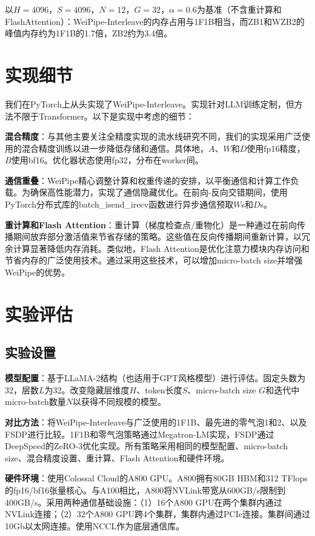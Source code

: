 以$H=4096$，$S=4096$，$N=12$，$G=32$，$\alpha=0.6$为基准（不含重计算和FlashAttention）：WeiPipe-Interleave的内存占用与1F1B相当，而ZB1和WZB2的峰值内存约为1F1B的1.7倍，ZB2约为3.4倍。

\section{实现细节}

我们在PyTorch上从头实现了WeiPipe-Interleave。实现针对LLM训练定制，但方法不限于Transformer。以下是实现中考虑的细节：

\textbf{混合精度}：与其他主要关注全精度实现的流水线研究不同，我们的实现采用广泛使用的混合精度训练以进一步降低存储和通信。具体地，$A$、$W$和$D$使用fp16精度，$B$使用bf16。优化器状态使用fp32，分布在worker间。

\textbf{通信重叠}：WeiPipe精心调整计算和权重传递的安排，以平衡通信和计算工作负载。为确保高性能潜力，实现了通信隐藏优化。在前向-反向交错期间，使用PyTorch分布式库的batch\_isend\_irecv函数进行异步通信预取$W$s和$D$s。

\textbf{重计算和Flash Attention}：重计算（梯度检查点/重物化）是一种通过在前向传播期间放弃部分激活值来节省存储的策略。这些值在反向传播期间重新计算，以冗余计算显著降低内存消耗。类似地，Flash Attention是优化注意力模块内存访问和节省内存的广泛使用技术。通过采用这些技术，可以增加micro-batch size并增强WeiPipe的优势。

\section{实验评估}

\subsection{实验设置}

\textbf{模型配置}：基于LLaMA-2结构（也适用于GPT风格模型）进行评估。固定头数为32，层数$L$为32。改变隐藏层维度$H$、token长度$S$、micro-batch size $G$和迭代中micro-batch数量$N$以获得不同规模的模型。

\textbf{对比方法}：将WeiPipe-Interleave与广泛使用的1F1B、最先进的零气泡1和2、以及FSDP进行比较。1F1B和零气泡策略通过Megatron-LM实现，FSDP通过DeepSpeed的ZeRO-3优化实现。所有策略采用相同的模型配置、micro-batch size、混合精度设置、重计算、Flash Attention和硬件环境。

\textbf{硬件环境}：使用Colossal Cloud的A800 GPU。A800拥有80GB HBM和312 TFlops的fp16/bf16张量核心。与A100相比，A800将NVLink带宽从600GB/s限制到400GB/s。采用两种通信基础设施：（1）16个A800 GPU在两个集群内通过NVLink连接；（2）32个A800 GPU跨4个集群，集群内通过PCIe连接。集群间通过10Gb以太网连接。使用NCCL作为底层通信库。

